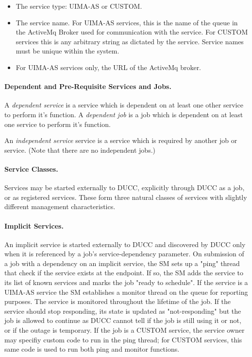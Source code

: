       \begin{itemize}
         \item The service type: UIMA-AS or CUSTOM.

         \item The service name. For UIMA-AS services, this is the name of the queue in the ActiveMq
           Broker used for communication with the service. For CUSTOM services this is any arbitrary
           string as dictated by the service. Service names must be unique within the system.

         \item For UIMA-AS services only, the URL of the ActiveMq broker.  
      \end{itemize}

      \paragraph{Dependent and Pre-Requisite Services and Jobs.} A {\em dependent service} is a
      service which is dependent on at least one other service to perform it's function. A {\em
        dependent job} is a job which is dependent on at least one service to perform it's function.

      An {\em independent service} service is a service which is required by another job or
      service. (Note that there are no independent jobs.)

      \paragraph{Service Classes.} Services may be started externally to DUCC, explicitly through
      DUCC as a job, or as registered services. These form three natural classes of services with
      slightly different management characteristics.

      \paragraph{Implicit Services.} An implicit service is started externally to DUCC and discovered by DUCC only
      when it is referenced by a job's service-dependency parameter. On submission of a job with a
      dependency on an implicit service, the SM sets up a "ping" thread that check if the service
      exists at the endpoint. If so, the SM adds the service to its list of known services and marks
      the job "ready to schedule". If the service is a UIMA-AS service the SM establishes a monitor
      thread on the queue for reporting purposes. The service is monitored throughout the lifetime of
      the job. If the service should stop responding, its state is updated as "not-responding" but the
      job is allowed to continue as DUCC cannot tell if the job is still using it or not, or if the
      outage is temporary. If the job is a CUSTOM service, the service owner may specifiy custom code
      to run in the ping thread; for CUSTOM services, this same code is used to run both ping and
      monitor functions.
      
